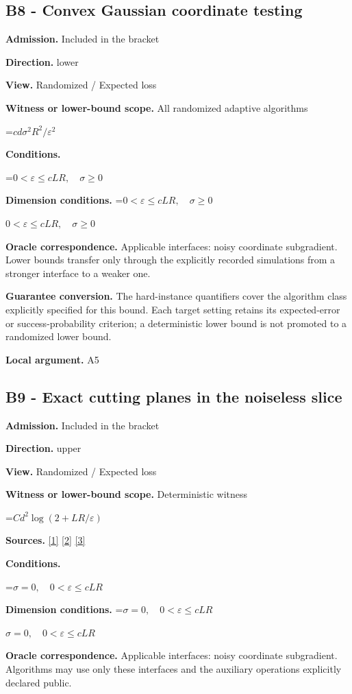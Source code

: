 \documentclass[10pt,a4paper]{article}
\newcommand{\AtlasMath}[1]{\par\begingroup\centering\setbox0=\hbox{$\displaystyle #1$}\ifdim\wd0>1.4\linewidth\typeout{ATLAS WIDE FORMULA: \the\wd0}\fi\ifdim\wd0>\linewidth\resizebox{\linewidth}{!}{\box0}\else\box0\fi\par\endgroup}
\newcommand{\AtlasInlineMath}[1]{\begingroup\setbox0=\hbox{$#1$}\ifdim\wd0>.4\linewidth\endgroup\AtlasMath{#1}\else\endgroup$#1$\fi}
\begin{document}
\subsection{B8 - Convex Gaussian coordinate testing}
\textbf{Admission.} Included in the bracket

\textbf{Direction.} lower

\textbf{View.} Randomized / Expected loss

\textbf{Witness or lower-bound scope.} All randomized adaptive algorithms

\AtlasMath{cd\sigma^2R^2/\varepsilon^2}
\textbf{Conditions.} 
\AtlasMath{0<\varepsilon\le cLR,\quad\sigma\ge0}


\textbf{Dimension conditions.} \AtlasInlineMath{0<\varepsilon\le cLR,\quad\sigma\ge0}

\textbf{Oracle correspondence.} Applicable interfaces: noisy coordinate subgradient. Lower bounds transfer only through the explicitly recorded simulations from a stronger interface to a weaker one.

\textbf{Guarantee conversion.} The hard-instance quantifiers cover the algorithm class explicitly specified for this bound. Each target setting retains its expected-error or success-probability criterion; a deterministic lower bound is not promoted to a randomized lower bound.

\textbf{Local argument.} A5

\subsection{B9 - Exact cutting planes in the noiseless slice}
\textbf{Admission.} Included in the bracket

\textbf{Direction.} upper

\textbf{View.} Randomized / Expected loss

\textbf{Witness or lower-bound scope.} Deterministic witness

\AtlasMath{Cd^2\log(2+LR/\varepsilon)}
\textbf{Sources.} \href{https://arxiv.org/pdf/1405.4980}{[1]} \href{https://www2.isye.gatech.edu/~nemirovs/MOR_AccuracyCertificates.pdf}{[2]} \href{https://arxiv.org/pdf/2609.20701}{[3]}

\textbf{Conditions.} 
\AtlasMath{\sigma=0,\quad0<\varepsilon\le cLR}


\textbf{Dimension conditions.} \AtlasInlineMath{\sigma=0,\quad0<\varepsilon\le cLR}

\textbf{Oracle correspondence.} Applicable interfaces: noisy coordinate subgradient. Algorithms may use only these interfaces and the auxiliary operations explicitly declared public.
\end{document}
